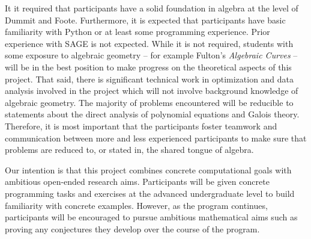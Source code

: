 \documentclass[12pt]{article}
\begin{document}
It it required that participants have a solid foundation in algebra at the level of Dummit and Foote. Furthermore, it is expected that participants have basic familiarity with Python or at least some programming experience. Prior experience with SAGE is not expected. While it is not required, students with some exposure to algebraic geometry -- for example Fulton's \textit{Algebraic Curves} -- will be in the best position to make progress on the theoretical aspects of this project. That said, there is significant technical work in optimization and data analysis involved in the project which will not involve background knowledge of algebraic geometry. The majority of problems encountered will be reducible to statements about the direct analysis of polynomial equations and Galois theory. Therefore, it is most important that the participants foster teamwork and communication between more and less experienced participants to make sure that problems are reduced to, or stated in, the shared tongue of algebra. 
\bigskip \par
Our intention is that this project combines concrete computational goals with ambitious open-ended research aims. Participants will be given concrete programming tasks and exercises at the advanced undergraduate level to build familiarity with concrete examples. However, as the program continues, participants will be encouraged to pursue ambitious mathematical aims such as proving any conjectures they develop over the course of the program. 

\printbibliography
\end{document}
